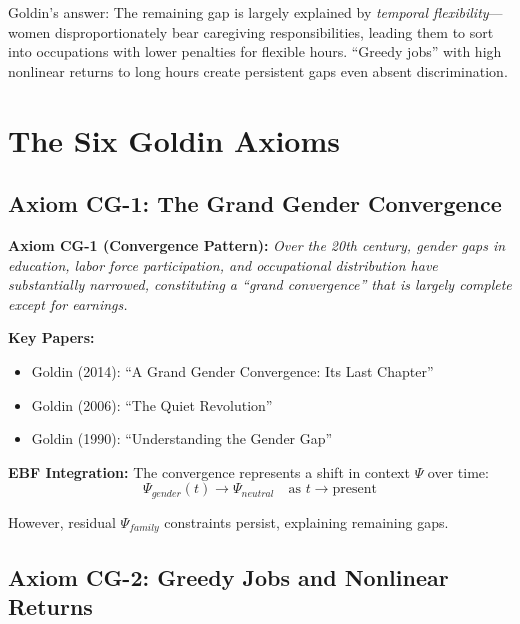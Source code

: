 Goldin's answer: The remaining gap is largely explained by \textit{temporal
flexibility}---women disproportionately bear caregiving responsibilities,
leading them to sort into occupations with lower penalties for flexible hours.
``Greedy jobs'' with high nonlinear returns to long hours create persistent
gaps even absent discrimination.

\section{The Six Goldin Axioms}

\subsection{Axiom CG-1: The Grand Gender Convergence}

\begin{tcolorbox}[colback=blue!5!white, colframe=blue!75!black]
\textbf{Axiom CG-1 (Convergence Pattern):}
\textit{Over the 20th century, gender gaps in education, labor force
participation, and occupational distribution have substantially narrowed,
constituting a ``grand convergence'' that is largely complete except for
earnings.}
\end{tcolorbox}

\textbf{Key Papers:}
\begin{itemize}[nosep]
    \item Goldin (2014): ``A Grand Gender Convergence: Its Last Chapter''
    \item Goldin (2006): ``The Quiet Revolution''
    \item Goldin (1990): ``Understanding the Gender Gap''
\end{itemize}

\textbf{EBF Integration:}
The convergence represents a shift in context $\Psi$ over time:
\begin{equation}
\Psi_{gender}(t) \rightarrow \Psi_{neutral} \quad \text{as } t \rightarrow \text{present}
\end{equation}

However, residual $\Psi_{family}$ constraints persist, explaining remaining gaps.

\subsection{Axiom CG-2: Greedy Jobs and Nonlinear Returns}

